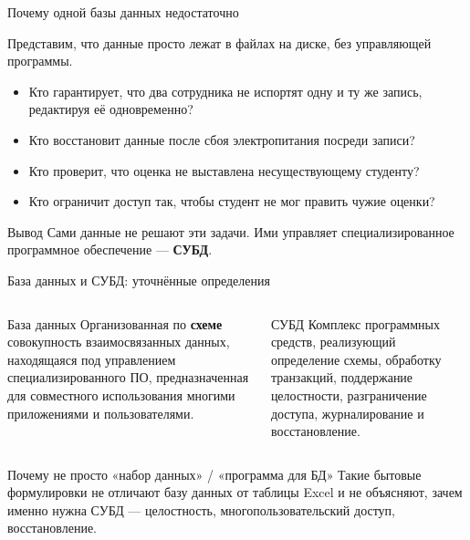 \documentclass[aspectratio=169]{beamer}
\begin{document}

\begin{frame}{Почему одной базы данных недостаточно}

Представим, что данные просто лежат в файлах на диске,
без управляющей программы.

\vspace{0.3cm}

\begin{itemize}
  \item Кто гарантирует, что два сотрудника не испортят
        одну и ту же запись, редактируя её одновременно?
  \item Кто восстановит данные после сбоя электропитания
        посреди записи?
  \item Кто проверит, что оценка не выставлена
        несуществующему студенту?
  \item Кто ограничит доступ так, чтобы студент не мог
        править чужие оценки?
\end{itemize}

\vspace{0.3cm}

\begin{alertblock}{Вывод}
Сами данные не решают эти задачи. Ими управляет
специализированное программное обеспечение — \textbf{СУБД}.
\end{alertblock}

\end{frame}


\begin{frame}{База данных и СУБД: уточнённые определения}

\small
\begin{columns}[T]
\begin{block}{База данных}
Организованная по \textbf{схеме} совокупность
взаимосвязанных данных, находящаяся под управлением
специализированного ПО, предназначенная для совместного
использования многими приложениями и пользователями.
\end{block}
\begin{block}{СУБД}
Комплекс программных средств, реализующий определение
схемы, обработку транзакций, поддержание целостности,
разграничение доступа, журналирование и восстановление.
\end{block}
\end{columns}

\vspace{0.4cm}

\begin{alertblock}{Почему не просто «набор данных» / «программа для БД»}
Такие бытовые формулировки не отличают базу данных
от таблицы Excel и не объясняют, зачем именно нужна СУБД —
целостность, многопользовательский доступ, восстановление.
\end{alertblock}

\end{frame}
\end{document}
